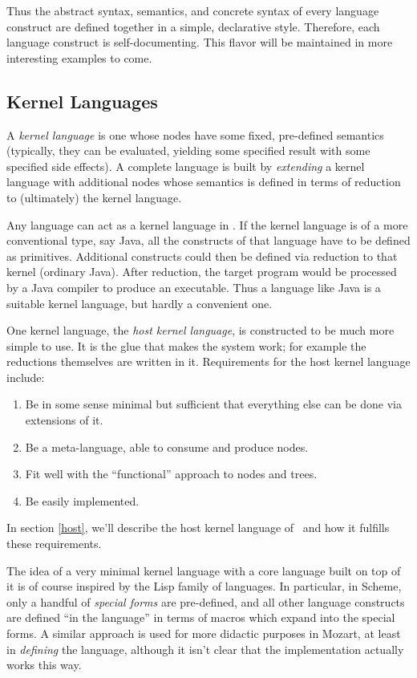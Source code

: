Thus the abstract syntax, semantics, and concrete syntax of every language construct are defined together in a simple, declarative style. Therefore, each language construct is self-documenting. This flavor will be maintained in more interesting examples to come.


\subsection{Kernel Languages}
A \emph{kernel language} is one whose nodes have some fixed, pre-defined semantics (typically, they can be evaluated, yielding some specified result with some specified side effects). A complete language is built by \emph{extending} a kernel language with additional nodes whose semantics is defined in terms of reduction to (ultimately) the kernel language.

Any language can act as a kernel language in \Meta. If the kernel language is of a more conventional type, say Java, all the constructs of that language have to be defined as primitives. Additional constructs could then be defined via reduction to that kernel (ordinary Java). After reduction, the target program would be processed by a Java compiler to produce an executable. Thus a language like Java is a suitable kernel language, but hardly a convenient one.

One kernel language, the \emph{host kernel language}, is constructed to be much more simple to use. It is the glue that makes the system work; for example the reductions themselves are written in it. Requirements for the host kernel language include:
\begin{enumerate}
\item Be in some sense minimal but sufficient that everything else can be done via extensions of it.
\item Be a meta-language, able to consume and produce nodes.
\item Fit well with the ``functional'' approach to nodes and trees.
\item Be easily implemented.
\end{enumerate}

In section \ref{host}, we'll describe the host kernel language of \Meta\ and how it fulfills these requirements.

The idea of a very minimal kernel language with a core language built on top of it is of course inspired by the Lisp family of languages. In particular, in Scheme\cite{scheme}, only a handful of \emph{special forms} are pre-defined, and all other language constructs are defined ``in the language'' in terms of macros which expand into the special forms. A similar approach is used for more didactic purposes in Mozart\cite{mozart}, at least in \emph{defining} the language, although it isn't clear that the implementation actually works this way.

